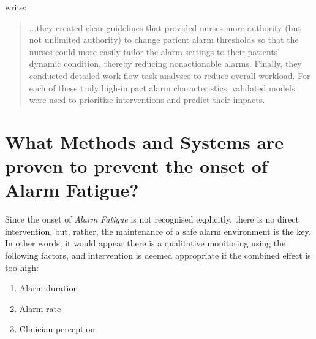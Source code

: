 \citet[p.291]{rayo2016diagnosing} write: \\

\begin{quotation}
	...they created clear guidelines
	that provided nurses more authority (but not unlimited authority) to change patient alarm thresholds so that the nurses could
	more easily tailor the alarm settings to their patients’ dynamic
	condition, thereby reducing nonactionable alarms. Finally, they
	conducted detailed work-flow task analyses to reduce overall
	workload. For each of these truly high-impact alarm characteristics, validated models were used to prioritize interventions and
	predict their impacts.
\end{quotation}

\section{What Methods and Systems are proven to prevent the onset of Alarm Fatigue?}

Since the onset of \textit{Alarm Fatigue} is not recognised explicitly, there is no direct intervention, but, rather, the maintenance of a safe alarm environment is the key. \\

In other words, it would appear there is a qualitative monitoring using the following factors, and intervention is deemed appropriate if the combined effect is too high: \\

\begin{enumerate}
	\item Alarm duration
	\item Alarm rate
	\item Clinician perception
\end{enumerate}

